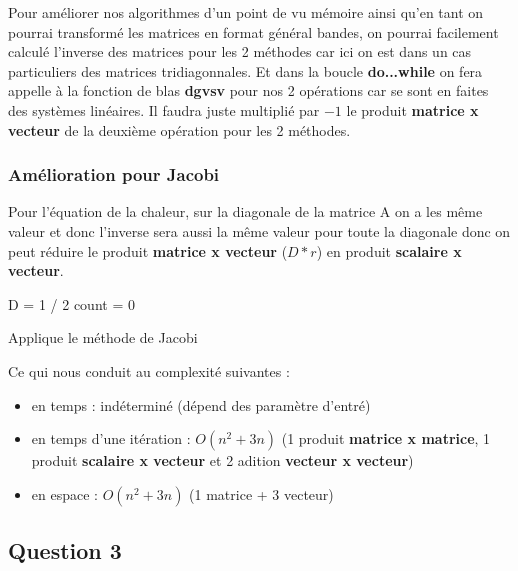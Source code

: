 \documentclass[11pt]{article}
\DeclarePairedDelimiter{\norm}{\lVert}{\rVert}
\begin{document}
Pour améliorer nos algorithmes d'un point de vu mémoire ainsi qu'en
tant on pourrai transformé les matrices en format général bandes, on
pourrai facilement calculé l'inverse des matrices pour les 2 méthodes
car ici on est dans un cas particuliers des matrices
tridiagonnales. Et dans la boucle \textbf{do...while} on fera appelle
à la fonction de blas \textbf{dgvsv} pour nos 2 opérations car se sont
en faites des systèmes linéaires. Il faudra juste multiplié par $-1$
le produit \textbf{matrice x vecteur} de la deuxième opération pour
les 2 méthodes.

\subsubsection{Amélioration pour Jacobi}

Pour l'équation de la chaleur, sur la diagonale de la matrice A on a
les même valeur et donc l'inverse sera aussi la même valeur pour toute
la diagonale donc on peut réduire le produit \textbf{matrice x
  vecteur} ($D * r$) en produit \textbf{scalaire x vecteur}.\newline
\vspace{5mm}
\begin{algorithm} [H]
  \SetAlgoLined

  D = 1 / 2\;
  count = 0\;
  

  \caption{Applique le méthode de Jacobi}
\end{algorithm}
\vspace{5mm}
Ce qui nous conduit au complexité suivantes :

\begin{itemize}
\item en temps : indéterminé (dépend des paramètre d'entré)
\item en temps d'une itération : $O(n^2 + 3n)$ (1 produit \textbf{matrice x
  matrice}, 1 produit \textbf{scalaire x vecteur} et 2 adition
  \textbf{vecteur x vecteur})
\item en espace : $O(n^2 + 3n)$ (1 matrice + 3 vecteur)
\end{itemize}

\subsection{Question 3}
\end{document}
